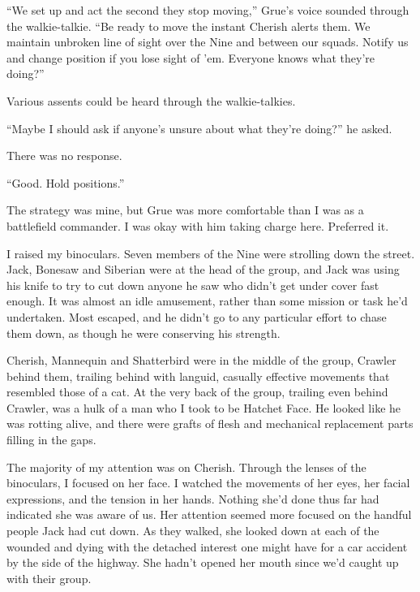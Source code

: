 





``We set up and act the second they stop moving,'' Grue's voice sounded through the walkie-talkie.  ``Be ready to move the instant Cherish alerts them.  We maintain unbroken line of sight over the Nine and between our squads.  Notify us and change position if you lose sight of 'em.  Everyone knows what they're doing?''



Various assents could be heard through the walkie-talkies.



``Maybe I should ask if anyone's unsure about what they're doing?'' he asked.



There was no response.



``Good.  Hold positions.''



The strategy was mine, but Grue was more comfortable than I was as a battlefield commander.  I was okay with him taking charge here.  Preferred it.



I raised my binoculars.  Seven members of the Nine were strolling down the street.  Jack, Bonesaw and Siberian were at the head of the group, and Jack was using his knife to try to cut down anyone he saw who didn't get under cover fast enough.  It was almost an idle amusement, rather than some mission or task he'd undertaken.  Most escaped, and he didn't go to any particular effort to chase them down, as though he were conserving his strength.



Cherish, Mannequin and Shatterbird were in the middle of the group, Crawler behind them, trailing behind with languid, casually effective movements that resembled those of a cat.  At the very back of the group, trailing even behind Crawler, was a hulk of a man who I took to be Hatchet Face.  He looked like he was rotting alive, and there were grafts of flesh and mechanical replacement parts filling in the gaps.



The majority of my attention was on Cherish.  Through the lenses of the binoculars, I focused on her face.  I watched the movements of her eyes, her facial expressions, and the tension in her hands.  Nothing she'd done thus far had indicated she was aware of us. Her attention seemed more focused on the handful people Jack had cut down.  As they walked, she looked down at each of the wounded and dying with the detached interest one might have for a car accident by the side of the highway.  She hadn't opened her mouth since we'd caught up with their group.



